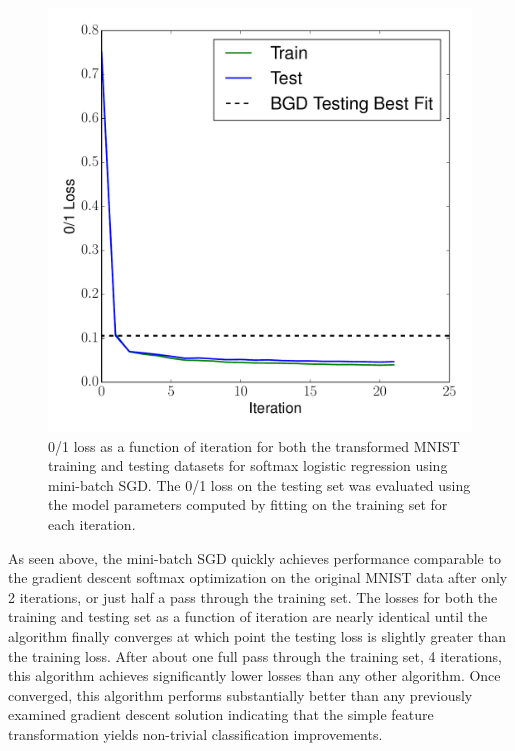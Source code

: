 \documentclass[12pt]{amsart}
\begin{document}
\begin{figure}[H]
	\includegraphics[width=\columnwidth]{sgd_nn_mnist_multi_train_test_01.pdf}
    \caption{0/1 loss as a function of iteration for both the transformed MNIST training and testing datasets for softmax logistic regression using mini-batch SGD.  The 0/1 loss on the testing set was evaluated using the model parameters computed by fitting on the training set for each iteration.}
    \label{fig:sgd_nn_mini_mnist_01}
\end{figure}

As seen above, the mini-batch SGD quickly achieves performance comparable to the gradient descent softmax optimization on the original MNIST data after only 2 iterations, or just half a pass through the training set.  The losses for both the training and testing set as a function of iteration are nearly identical until the algorithm finally converges at which point the testing loss is slightly greater than the training loss.  After about one full pass through the training set, 4 iterations, this algorithm achieves significantly lower losses than any other algorithm.  Once converged, this algorithm performs substantially better than any previously examined gradient descent solution indicating that the simple feature transformation yields non-trivial classification improvements.  
\end{document}
